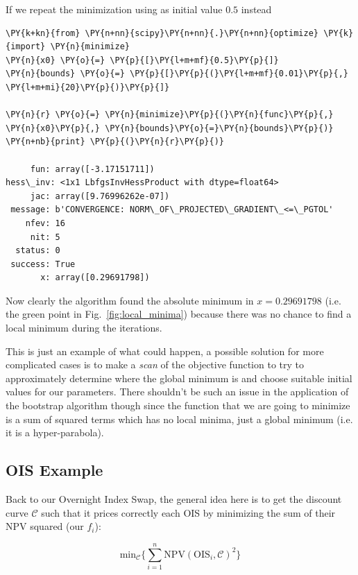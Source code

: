 If we repeat the minimization using as initial value $0.5$ instead
\begin{tcolorbox}[breakable, size=fbox, boxrule=1pt, pad at break*=1mm,colback=cellbackground, colframe=cellborder]
\begin{Verbatim}[commandchars=\\\{\}]
\PY{k+kn}{from} \PY{n+nn}{scipy}\PY{n+nn}{.}\PY{n+nn}{optimize} \PY{k}{import} \PY{n}{minimize}
\PY{n}{x0} \PY{o}{=} \PY{p}{[}\PY{l+m+mf}{0.5}\PY{p}{]}
\PY{n}{bounds} \PY{o}{=} \PY{p}{[}\PY{p}{(}\PY{l+m+mf}{0.01}\PY{p}{,} \PY{l+m+mi}{20}\PY{p}{)}\PY{p}{]}
		
\PY{n}{r} \PY{o}{=} \PY{n}{minimize}\PY{p}{(}\PY{n}{func}\PY{p}{,} \PY{n}{x0}\PY{p}{,} \PY{n}{bounds}\PY{o}{=}\PY{n}{bounds}\PY{p}{)}
\PY{n+nb}{print} \PY{p}{(}\PY{n}{r}\PY{p}{)}

     fun: array([-3.17151711])
hess\_inv: <1x1 LbfgsInvHessProduct with dtype=float64>
     jac: array([9.76996262e-07])
 message: b'CONVERGENCE: NORM\_OF\_PROJECTED\_GRADIENT\_<=\_PGTOL'
    nfev: 16
     nit: 5
  status: 0
 success: True
       x: array([0.29691798])
\end{Verbatim}
\end{tcolorbox}
Now clearly the algorithm found the absolute minimum in $x=0.29691798$ (i.e. the green point in Fig.~\ref{fig:local_minima}) because there was no chance to find a local minimum during the iterations.

This is just an example of what could happen, a possible solution for more complicated cases is to make a \emph{scan} of the objective function to try to approximately determine where the global minimum is and choose suitable initial values for our parameters.
There shouldn't be such an issue in the application of the bootstrap algorithm though since the function that we are going to minimize is a sum of squared terms which has no local minima, just a global minimum (i.e. it is a hyper-parabola).

\subsection{OIS Example}\label{ois-example}
Back to our Overnight Index Swap, the general idea here is to get the discount curve \(\mathcal{C}\) such that it prices correctly each OIS by minimizing the sum of their NPV squared (our \(f_i\)):

\begin{equation}
\mathrm{min}_{\mathcal{C}} \Big\{\sum_{i=1}^{n}\mathrm{NPV}(\mathrm{OIS}_i, \mathcal{C})^2\Big\}
\end{equation}

